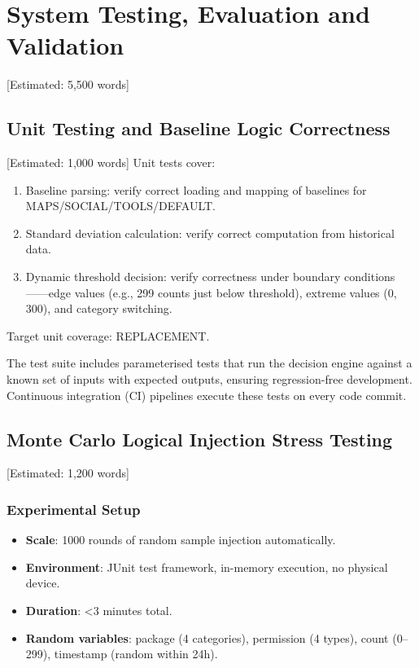 \newpage\section{System Testing, Evaluation and Validation} [Estimated: 5,500 words]

\subsection{Unit Testing and Baseline Logic Correctness} [Estimated: 1,000 words]
Unit tests cover:
\begin{enumerate}
\item Baseline parsing: verify correct loading and mapping of baselines for MAPS/SOCIAL/TOOLS/DEFAULT.
\item Standard deviation calculation: verify correct computation from historical data.
\item Dynamic threshold decision: verify correctness under boundary conditions——edge values (e.g., 299 counts just below threshold), extreme values (0, 300), and category switching.
\end{enumerate}

Target unit coverage: REPLACEMENT.

The test suite includes parameterised tests that run the decision engine against a known set of inputs with expected outputs, ensuring regression-free development. Continuous integration (CI) pipelines execute these tests on every code commit.

\subsection{Monte Carlo Logical Injection Stress Testing} [Estimated: 1,200 words]

\subsubsection{Experimental Setup}
\begin{itemize}
\item \textbf{Scale}: 1000 rounds of random sample injection automatically.
\item \textbf{Environment}: JUnit test framework, in-memory execution, no physical device.
\item \textbf{Duration}: <3 minutes total.
\item \textbf{Random variables}: package (4 categories), permission (4 types), count (0--299), timestamp (random within 24h).
\end{itemize}

